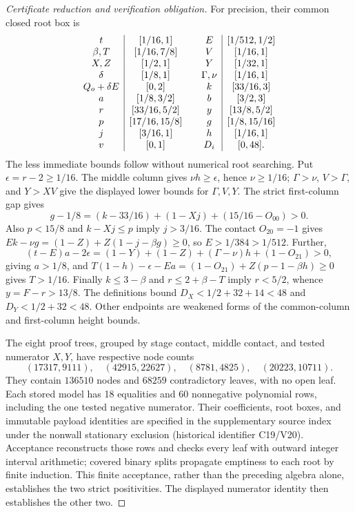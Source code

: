 \documentclass[11pt,reqno]{amsart}
\theoremstyle{definition}
\theoremstyle{remark}
\begin{document}
\begin{proof}[Certificate reduction and verification obligation]
For precision, their common closed root box is
\[
\begin{array}{c|c@{\qquad}c|c}
 t&[1/16,1]&E&[1/512,1/2]\\
 \beta,T&[1/16,7/8]&V&[1/16,1]\\
 X,Z&[1/2,1]&Y&[1/32,1]\\
 \delta&[1/8,1]&\Gamma,\nu&[1/16,1]\\
 Q_o+\delta E&[0,2]&k&[33/16,3]\\
 a&[1/8,3/2]&b&[3/2,3]\\
 r&[33/16,5/2]&y&[13/8,5/2]\\
 p&[17/16,15/8]&g&[1/8,15/16]\\
 j&[3/16,1]&h&[1/16,1]\\
 v&[0,1]&D_i&[0,48].
\end{array}
\]
The less immediate bounds follow without numerical root searching.
Put \(\epsilon=r-2\ge1/16\). The middle column gives
\(\nu h\ge\epsilon\), hence \(\nu\ge1/16\);
\(\Gamma>\nu\), \(V>\Gamma\), and \(Y>XV\) give the displayed
lower bounds for \(\Gamma,V,Y\). The strict first-column gap gives
\[
 g-1/8=(k-33/16)+(1-Xj)+(15/16-O_{00})>0.
\]
Also \(p<15/8\) and \(k-Xj\le p\) imply \(j>3/16\).
The contact \(O_{20}=-1\) gives
\(Ek-\nu g=(1-Z)+Z(1-j-\beta g)\ge0\), so
\(E>1/384>1/512\). Further,
\[
 (t-E)a-2\epsilon=(1-Y)+(1-Z)+(\Gamma-\nu)h+(1-O_{21})>0,
\]
giving \(a>1/8\), and
\(T(1-h)-\epsilon-Ea=(1-O_{21})+Z(p-1-\beta h)\ge0\)
gives \(T>1/16\). Finally
\(k\le3-\beta\) and \(r\le2+\beta-T\) imply
\(r<5/2\), whence \(y=F-r>13/8\).
The definitions bound \(D_X<1/2+32+14<48\) and
\(D_Y<1/2+32<48\). Other endpoints are weakened forms of the
common-column and first-column height bounds.

The eight proof trees, grouped by stage contact, middle contact, and
tested numerator \(X,Y\), have respective node counts
\[
 (17317,9111),\quad(42915,22627),\quad
 (8781,4825),\quad(20223,10711).
\]
They contain \(136510\) nodes and \(68259\) contradictory leaves,
with no open leaf. Each stored model has 18 equalities and 60
nonnegative polynomial rows, including the one tested negative
numerator. Their coefficients, root boxes, and immutable payload
identities are specified in the supplementary source index under
the nonwall stationary exclusion (historical identifier C19/V20).
Acceptance reconstructs those rows and checks every leaf with outward
integer interval arithmetic; covered binary splits propagate emptiness
to each root by finite induction. This finite acceptance, rather than
the preceding algebra alone, establishes the two strict positivities.
The displayed numerator identity then establishes the other two.
\end{proof}
\end{document}
